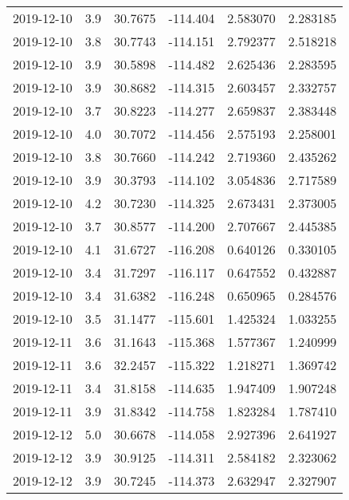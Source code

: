 \begin{tabular}{lrrrrr}
2019-12-10 &       3.9 &  30.7675 &  -114.404 &         2.583070 &         2.283185 \\
2019-12-10 &       3.8 &  30.7743 &  -114.151 &         2.792377 &         2.518218 \\
2019-12-10 &       3.9 &  30.5898 &  -114.482 &         2.625436 &         2.283595 \\
2019-12-10 &       3.9 &  30.8682 &  -114.315 &         2.603457 &         2.332757 \\
2019-12-10 &       3.7 &  30.8223 &  -114.277 &         2.659837 &         2.383448 \\
2019-12-10 &       4.0 &  30.7072 &  -114.456 &         2.575193 &         2.258001 \\
2019-12-10 &       3.8 &  30.7660 &  -114.242 &         2.719360 &         2.435262 \\
2019-12-10 &       3.9 &  30.3793 &  -114.102 &         3.054836 &         2.717589 \\
2019-12-10 &       4.2 &  30.7230 &  -114.325 &         2.673431 &         2.373005 \\
2019-12-10 &       3.7 &  30.8577 &  -114.200 &         2.707667 &         2.445385 \\
2019-12-10 &       4.1 &  31.6727 &  -116.208 &         0.640126 &         0.330105 \\
2019-12-10 &       3.4 &  31.7297 &  -116.117 &         0.647552 &         0.432887 \\
2019-12-10 &       3.4 &  31.6382 &  -116.248 &         0.650965 &         0.284576 \\
2019-12-10 &       3.5 &  31.1477 &  -115.601 &         1.425324 &         1.033255 \\
2019-12-11 &       3.6 &  31.1643 &  -115.368 &         1.577367 &         1.240999 \\
2019-12-11 &       3.6 &  32.2457 &  -115.322 &         1.218271 &         1.369742 \\
2019-12-11 &       3.4 &  31.8158 &  -114.635 &         1.947409 &         1.907248 \\
2019-12-11 &       3.9 &  31.8342 &  -114.758 &         1.823284 &         1.787410 \\
2019-12-12 &       5.0 &  30.6678 &  -114.058 &         2.927396 &         2.641927 \\
2019-12-12 &       3.9 &  30.9125 &  -114.311 &         2.584182 &         2.323062 \\
2019-12-12 &       3.9 &  30.7245 &  -114.373 &         2.632947 &         2.327907 \\

\end{tabular}
